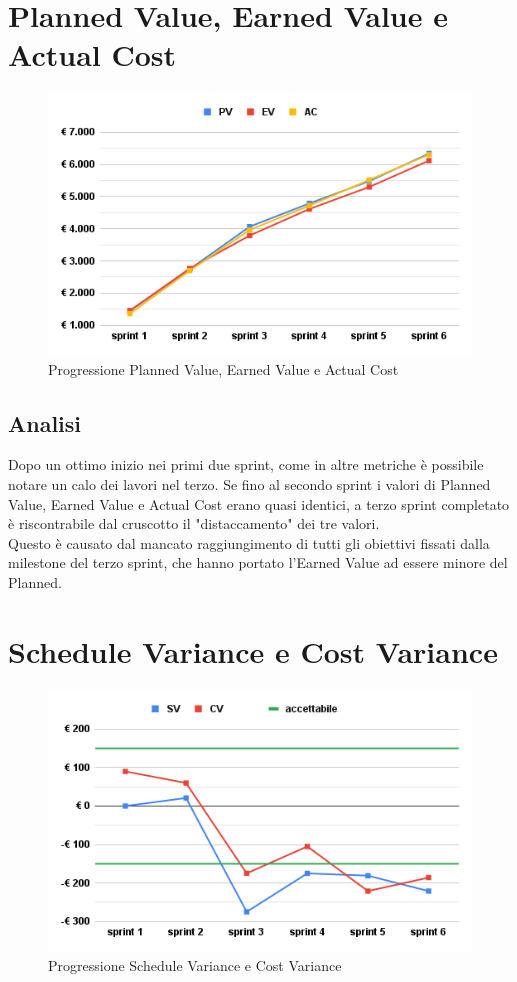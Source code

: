 \section{Planned Value, Earned Value e Actual Cost}
\begin{figure}[H]
    \centering
    \includegraphics[width=0.8\linewidth]{PVEVAC.png}
    \caption{Progressione Planned Value, Earned Value e Actual Cost}
\end{figure}
\subsection{Analisi}
Dopo un ottimo inizio nei primi due sprint, come in altre metriche è possibile notare un calo dei lavori nel terzo. Se fino al secondo sprint i valori di Planned Value, Earned Value e Actual Cost erano quasi identici, a terzo sprint completato è riscontrabile dal cruscotto il "distaccamento" dei tre valori.\\
Questo è causato dal mancato raggiungimento di tutti gli obiettivi fissati dalla milestone del terzo sprint, che hanno portato l'Earned Value ad essere minore del Planned.

\section{Schedule Variance e Cost Variance}
\begin{figure}[H]
    \centering
    \includegraphics[width=0.8\linewidth]{SVCV.png}
    \caption{Progressione Schedule Variance e Cost Variance}
\end{figure}
